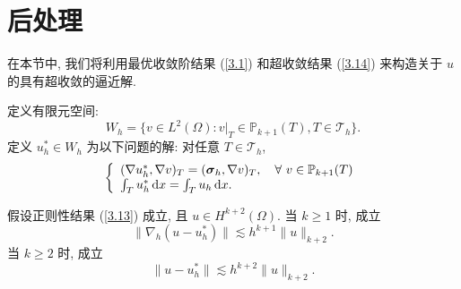 \section{后处理}
在本节中, 我们将利用最优收敛阶结果 (\ref{3.1}) 和超收敛结果 (\ref{3.14}) 来构造关于 $u$ 的具有超收敛的逼近解.

定义有限元空间:
$$W_h=\{v\in L^2(\Omega): v|_T\in\mathbb{P}_{k+1}(T), T\in\mathcal{T}_h\}.$$
定义 $u_h^\ast\in W_h$ 为以下问题的解: 对任意 $T\in\mathcal{T}_h$,
\begin{align}
\label{4.1}
\left\{
\begin{array}{ll}
(\nabla u_h^\ast,\nabla v)_T = (\boldsymbol\sigma_h,\nabla v)_T, \quad \forall \ v\in\mathbb{P}_{k+1}(T)\\
\int_T  u_h^\ast\,{\rm d}x = \int_T  u_h\,{\rm d}x.
\end{array}
\right.
\end{align}
\begin{theorem}
假设正则性结果 (\ref{3.13}) 成立, 且 $u\in H^{k+2}(\Omega)$.
当 $k\geq1$ 时, 成立
\begin{equation}
\label{4.3}
\|\nabla_h(u-u^\ast_h)\|\lesssim h^{k+1}\|u\|_{k+2}.
\end{equation}
当 $k\geq2$ 时, 成立
\begin{equation}
\label{4.2}
\|u-u^\ast_h\|\lesssim h^{k+2}\|u\|_{k+2}.
\end{equation}
\end{theorem}
